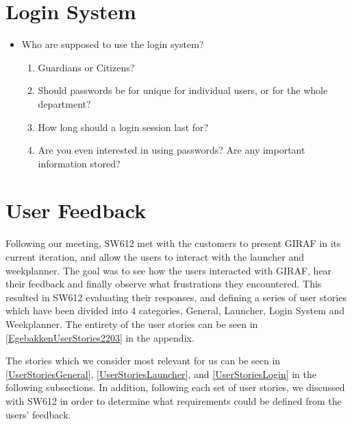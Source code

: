 \section*{Login System}
\begin{itemize}
  \item Who are supposed to use the login system?
  	\begin{enumerate}
  	\item Guardians or Citizens?
  	\item Should passwords be for unique for individual users, or for the whole
  	department?
  	\item How long should a login session last for?
  	\item Are you even interested in using passwords? Are any important
  	information stored?
	\end{enumerate}
\end{itemize}

\section{User Feedback}
Following our meeting, SW612 met with the customers to present GIRAF in its
current iteration, and allow the users to interact with the launcher and
weekplanner.
The goal was to see how the users interacted with GIRAF, hear their feedback and
finally observe what frustrations they encountered. This resulted in SW612
evaluating their responses, and defining a series of user stories which have
been divided into 4 categories, General, Launcher, Login System and Weekplanner.
The entirety of the user stories can be seen in
\autoref{EgebakkenUserStories2203} in the appendix.\nl

The stories which we consider most relevant for us can be seen in
\autoref{UserStoriesGeneral}, \autoref{UserStoriesLauncher}, and
\autoref{UserStoriesLogin} in the following subsections. In addition, following
each set of user stories, we discussed with SW612 in order to determine what
requirements could be defined from the users' feedback.

